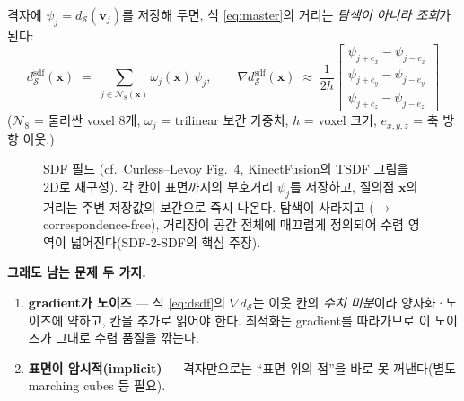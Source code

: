 격자에 $\psi_j = d_{\mathcal{S}}(\mathbf{v}_j)$를 저장해 두면, 식
\eqref{eq:master}의 거리는 \emph{탐색이 아니라 조회}가 된다:
\begin{equation}
  d_{\mathcal{S}}^{\text{sdf}}(\mathbf{x})
  \;=\; \sum_{j\in\mathcal{N}_8(\mathbf{x})} \omega_j(\mathbf{x})\,\psi_j,
  \qquad
  \nabla d_{\mathcal{S}}^{\text{sdf}}(\mathbf{x})
  \;\approx\; \frac{1}{2h}
  \begin{bmatrix}
    \psi_{j+e_x}-\psi_{j-e_x}\\
    \psi_{j+e_y}-\psi_{j-e_y}\\
    \psi_{j+e_z}-\psi_{j-e_z}
  \end{bmatrix}
  \label{eq:dsdf}
\end{equation}
($\mathcal{N}_8$ = 둘러싼 voxel 8개, $\omega_j$ = trilinear 보간 가중치,
$h$ = voxel 크기, $e_{x,y,z}$ = 축 방향 이웃.)

\begin{figure}[htbp]
\centering
{}
\caption{SDF 필드 (cf.\ Curless--Levoy Fig.~4, KinectFusion의 TSDF 그림을
2D로 재구성). 각 칸이 표면까지의 부호거리 $\psi_j$를 저장하고, 질의점
$\mathbf{x}$의 거리는 주변 저장값의 보간으로 즉시 나온다. 탐색이 사라지고
($\to$ correspondence-free), 거리장이 공간 전체에 매끄럽게 정의되어 수렴
영역이 넓어진다(SDF-2-SDF의 핵심 주장).}
\label{fig:sdf-grid}
\end{figure}

\textbf{그래도 남는 문제 두 가지.}
\begin{enumerate}
  \item \textbf{gradient가 노이즈} --- 식 \eqref{eq:dsdf}의 $\nabla
  d_{\mathcal{S}}$는 이웃 칸의 \emph{수치 미분}이라 양자화·노이즈에 약하고,
  칸을 추가로 읽어야 한다. 최적화는 gradient를 따라가므로 이 노이즈가 그대로
  수렴 품질을 깎는다.
  \item \textbf{표면이 암시적(implicit)} --- 격자만으로는 ``표면 위의 점''을
  바로 못 꺼낸다(별도 marching cubes 등 필요).
\end{enumerate}

